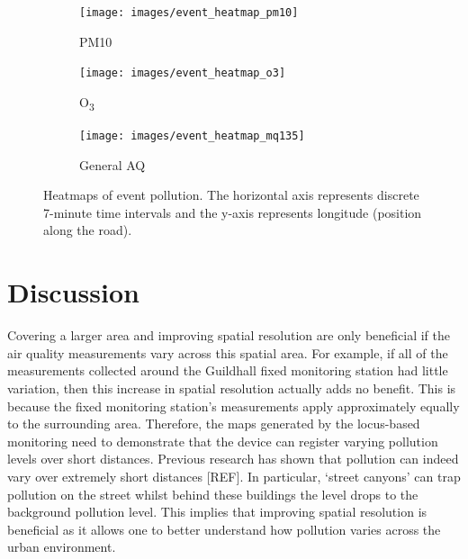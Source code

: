 \documentclass[11pt,twosided,a4paper]{report}
\begin{document}
\begin{figure}[!tb]
    \centering
    \begin{minipage}{1\linewidth}
            \begin{subfigure}[t]{.5\linewidth}
                \texttt{[image: images/event\_heatmap\_pm10]}
                \caption{PM10}
                \label{fig:event_heatmap_pm10}
            \end{subfigure}
            \begin{subfigure}[t]{.5\linewidth}
            	\texttt{[image: images/event\_heatmap\_o3]}
            	\caption{O\textsubscript{3}}
            	\label{fig:event_heatmap_o3}
	   \end{subfigure}
        \end{minipage}
    \begin{minipage}{1\linewidth}
    	\centering
            \begin{subfigure}[t]{.5\linewidth}
                \texttt{[image: images/event\_heatmap\_mq135]}
                \caption{General AQ}
                \label{fig:event_heatmap_mq135}
            \end{subfigure}
        \end{minipage}
    \caption[Heatmaps of event pollution.]{Heatmaps of event pollution. The horizontal axis represents discrete 7-minute time intervals and the y-axis represents longitude (position along the road).}
    \label{fig:event_heatmaps}
\end{figure}

\section{Discussion}

Covering a larger area and improving spatial resolution are only beneficial if the air quality measurements vary across this spatial area. For example, if all of the measurements collected around the Guildhall fixed monitoring station had little variation, then this increase in spatial resolution actually adds no benefit. This is because the fixed monitoring station's measurements apply approximately equally to the surrounding area. Therefore, the maps generated by the locus-based monitoring need to demonstrate that the device can register varying pollution levels over short distances. Previous research has shown that pollution can indeed vary over extremely short distances [REF]. In particular, `street canyons' can trap pollution on the street whilst behind these buildings the level drops to the background pollution level. This implies that improving spatial resolution is beneficial as it allows one to better understand how pollution varies across the urban environment. 
\end{document}
